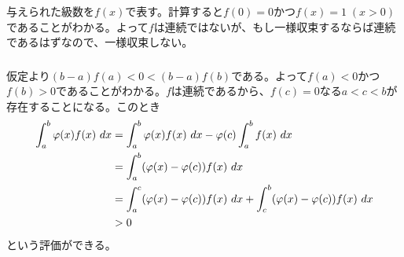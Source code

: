 \newpage

\subsubsection{}%
\begin{sol}
  与えられた級数を$f(x)$で表す。計算すると$f(0)=0$かつ$f(x)=1 \; (x > 0)$であることがわかる。よって$f$は連続ではないが、もし一様収束するならば連続であるはずなので、一様収束しない。
\end{sol}

\newpage

\subsubsection{}%
\begin{sol}
  仮定より$(b-a)f(a) < 0 < (b-a)f(b)$である。よって$f(a)<0$かつ$f(b)>0$であることがわかる。$f$は連続であるから、$f(c)=0$なる$a < c < b$が存在することになる。このとき
  \begin{align*}
    \int_a^b {\varphi}(x) f(x) \ dx  &= \int_a^b {\varphi}(x) f(x) \ dx  - {\varphi}(c) \int_a^b f(x) \ dx \\
    &= \int_a^b ({\varphi}(x) - {\varphi}(c)) f(x) \ dx \\
    &= \int_a^c ({\varphi}(x) - {\varphi}(c)) f(x) \ dx + \int_c^b ({\varphi}(x) - {\varphi}(c)) f(x) \ dx \\
    &> 0
   \end{align*}
   という評価ができる。
\end{sol}
